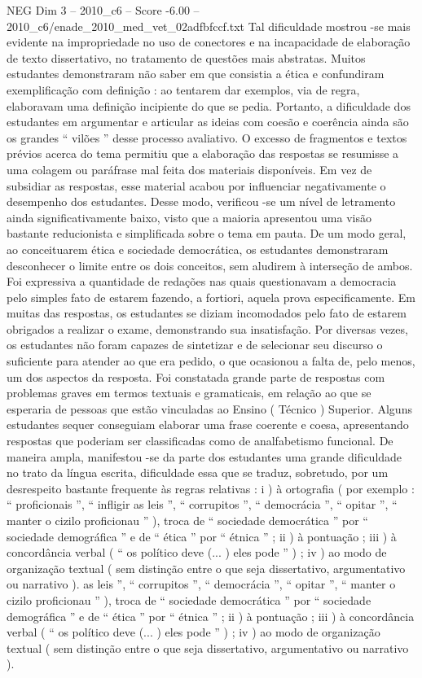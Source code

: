 \begin{textsample}{NEG Dim 3 – 2010\_c6 – Score -6.00 – 2010\_c6/enade\_2010\_med\_vet\_02adfbfccf.txt}
Tal dificuldade mostrou -se mais evidente na impropriedade no uso de conectores e na incapacidade de elaboração de texto dissertativo, no tratamento de questões mais abstratas.
Muitos estudantes demonstraram não saber em que consistia a ética e confundiram exemplificação com definição : ao tentarem dar exemplos, via de regra, elaboravam uma definição incipiente do que se pedia.
Portanto, a dificuldade dos estudantes em argumentar e articular as ideias com coesão e coerência ainda são os grandes “ vilões ” desse processo avaliativo.
O excesso de fragmentos e textos prévios acerca do tema permitiu que a elaboração das respostas se resumisse a uma colagem ou paráfrase mal feita dos materiais disponíveis.
Em vez de subsidiar as respostas, esse material acabou por influenciar negativamente o desempenho dos estudantes.
Desse modo, verificou -se um nível de letramento ainda significativamente baixo, visto que a maioria apresentou uma visão bastante reducionista e simplificada sobre o tema em pauta.
De um modo geral, ao conceituarem ética e sociedade democrática, os estudantes demonstraram desconhecer o limite entre os dois conceitos, sem aludirem à interseção de ambos.
Foi expressiva a quantidade de redações nas quais questionavam a democracia pelo simples fato de estarem fazendo, a fortiori, aquela prova especificamente.
Em muitas das respostas, os estudantes se diziam incomodados pelo fato de estarem obrigados a realizar o exame, demonstrando sua insatisfação.
Por diversas vezes, os estudantes não foram capazes de sintetizar e de selecionar seu discurso o suficiente para atender ao que era pedido, o que ocasionou a falta de, pelo menos, um dos aspectos da resposta.
Foi constatada grande parte de respostas com problemas graves em termos textuais e gramaticais, em relação ao que se esperaria de pessoas que estão vinculadas ao Ensino ( Técnico ) Superior.
Alguns estudantes sequer conseguiam elaborar uma frase coerente e coesa, apresentando respostas que poderiam ser classificadas como de analfabetismo funcional.
De maneira ampla, manifestou -se da parte dos estudantes uma grande dificuldade no trato da língua escrita, dificuldade essa que se traduz, sobretudo, por um desrespeito bastante frequente às regras relativas : i ) à ortografia ( por exemplo : “ proficionais ”, “ infligir as leis ”, “ corrupitos ”, “ democrácia ”, “ opitar ”, “ manter o cizilo proficionau ” ), troca de “ sociedade democrática ” por “ sociedade demográfica ” e de “ ética ” por “ étnica ” ; ii ) à pontuação ; iii ) à concordância verbal ( “ os político deve (... ) eles pode ” ) ; iv ) ao modo de organização textual ( sem distinção entre o que seja dissertativo, argumentativo ou narrativo ). as leis ”, “ corrupitos ”, “ democrácia ”, “ opitar ”, “ manter o cizilo proficionau ” ), troca de “ sociedade democrática ” por “ sociedade demográfica ” e de “ ética ” por “ étnica ” ; ii ) à pontuação ; iii ) à concordância verbal ( “ os político deve (... ) eles pode ” ) ; iv ) ao modo de organização textual ( sem distinção entre o que seja dissertativo, argumentativo ou narrativo ).

\end{textsample}
